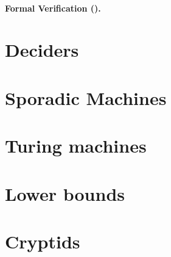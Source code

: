 \documentclass[a4paper,british]{article}
\theoremstyle{definition} %
\numberwithin{equation}{section}
\theoremstyle{definition} %
\begin{document}
\paragraph{Formal Verification (\Coq).}

\section{Deciders}

% 
% 

% 
% 
% 

\section{Sporadic Machines}





\newpage


\appendix

\section{Turing machines}\label{app:TMs}
\section{Lower bounds}\label{app:lowerbounds}
\section{Cryptids}\label{app:cryptids}
\end{document}
